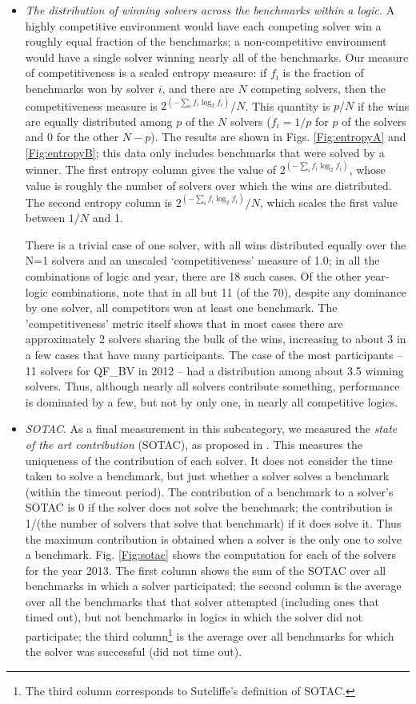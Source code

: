 \documentclass{eptcs}
\begin{document}
\begin{itemize}
\item {\em The distribution of winning solvers across the benchmarks within a logic.} A highly competitive environment would have each competing solver win a roughly equal fraction of the benchmarks; a non-competitive environment would have a single solver winning nearly all of the benchmarks. Our measure of competitiveness is a scaled entropy measure: if $f_i$ is the fraction of benchmarks won by solver $i$, and there are $N$ competing solvers, then the competitiveness measure is $ 2^{( - \sum_i f_i \log_2 f_i )} / N$. This quantity is $p/N$ if the wins are equally distributed among $p$ of the $N$ solvers ($f_i = 1/p$ for $p$ of the solvers and 0 for the other $N-p$). The results are shown in Figs. \ref{Fig:entropyA} and \ref{Fig:entropyB}; this data only includes benchmarks that were solved by a winner. The first entropy column gives the value of $ 2^{( - \sum_i f_i \log_2 f_i )}$, whose value is roughly the number of solvers over which the wins are distributed. The second entropy column is  $ 2^{( - \sum_i f_i \log_2 f_i )} / N$, which scales the first value between 
$1/N$ and 1.

There is a trivial case of one solver, with all wins distributed equally over the N=1 solvers and an unscaled `competitiveness' measure of 1.0; in all the combinations of logic and year, there are 18 such cases. Of the other year-logic combinations, note that in all but 11 (of the 70), despite any dominance by one solver, all competitors won at least one benchmark. The 'competitiveness' metric itself shows that in most cases there are approximately 2 solvers sharing the bulk of the wins, increasing to about 3 in a few cases that have many participants. The case of the most participants -- 11 solvers for QF\_BV in 2012 -- had a distribution among about 3.5 winning solvers. Thus, although nearly all solvers contribute something, performance is dominated by a few, but not by only one, in nearly all competitive logics.

\item {\em SOTAC}. As a final measurement in this subcategory, we measured the {\em state of the art contribution} (SOTAC), as proposed  in \cite{webCASC}. This measures the uniqueness of the contribution of each solver. It does not consider the time taken to solve a benchmark, but just whether a solver solves a benchmark (within the timeout period). The contribution of a benchmark to a solver's SOTAC is 0 if the solver does not solve the benchmark; the contribution is 1/(the number of solvers that solve that benchmark) if it does solve it. Thus the maximum contribution is obtained when a solver is the only one to solve a benchmark. Fig. \ref{Fig:sotac} shows the computation for each of the solvers for the year 2013. The first column shows the sum of the SOTAC over all benchmarks in which a solver participated;
the second column is the average over all the benchmarks that that solver attempted (including ones that timed out), but not benchmarks in logics in which the solver did not participate; the third column\footnote{The third column corresponds to Sutcliffe's definition of SOTAC.} is the average over all benchmarks for which the solver was successful (did not time out).


\end{itemize}
\end{document}
